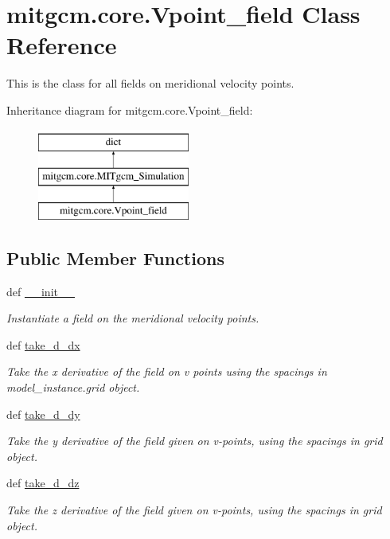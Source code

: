 \hypertarget{classmitgcm_1_1core_1_1Vpoint__field}{}\section{mitgcm.\+core.\+Vpoint\+\_\+field Class Reference}
\label{classmitgcm_1_1core_1_1Vpoint__field}


This is the class for all fields on meridional velocity points.  


Inheritance diagram for mitgcm.\+core.\+Vpoint\+\_\+field\+:\begin{figure}[H]
\begin{center}
\leavevmode
\includegraphics[height=3.000000cm]{classmitgcm_1_1core_1_1Vpoint__field}
\end{center}
\end{figure}
\subsection*{Public Member Functions}
\begin{DoxyCompactItemize}
\item 
def \hyperlink{classmitgcm_1_1core_1_1Vpoint__field_a1ffd906684a51a4045b0b02092fab5ec}{\+\_\+\+\_\+init\+\_\+\+\_\+}
\begin{DoxyCompactList}\small\item\em Instantiate a field on the meridional velocity points. \end{DoxyCompactList}\item 
def \hyperlink{classmitgcm_1_1core_1_1Vpoint__field_a0077d0cdd01de210b130f1e684d61b6d}{take\+\_\+d\+\_\+dx}
\begin{DoxyCompactList}\small\item\em Take the x derivative of the field on v points using the spacings in model\+\_\+instance.\+grid object. \end{DoxyCompactList}\item 
def \hyperlink{classmitgcm_1_1core_1_1Vpoint__field_a7ffa6c1b239c78422f0224d675fd785e}{take\+\_\+d\+\_\+dy}
\begin{DoxyCompactList}\small\item\em Take the y derivative of the field given on v-\/points, using the spacings in grid object. \end{DoxyCompactList}\item 
def \hyperlink{classmitgcm_1_1core_1_1Vpoint__field_a9975d2dcfb23b8cca0986f7e469882fa}{take\+\_\+d\+\_\+dz}
\begin{DoxyCompactList}\small\item\em Take the z derivative of the field given on v-\/points, using the spacings in grid object. \end{DoxyCompactList}\end{DoxyCompactItemize}
